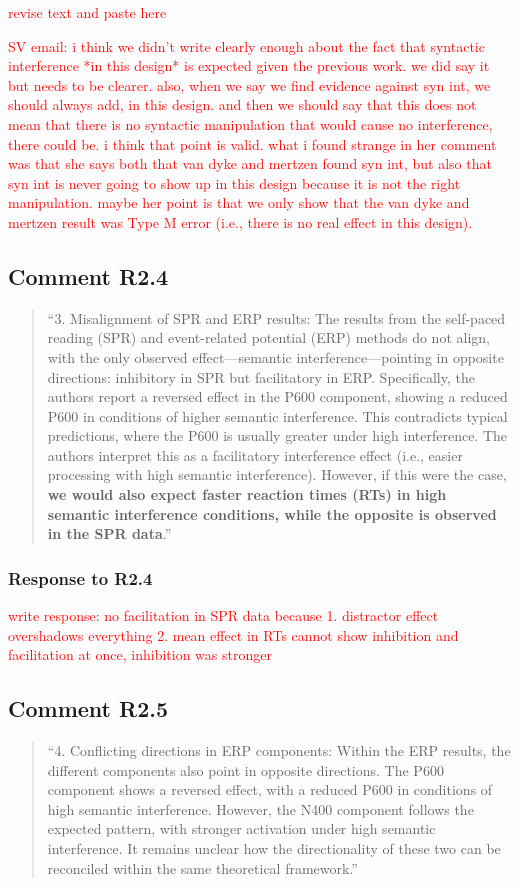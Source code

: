 \documentclass[12pt]{article}
\begin{document}
\textcolor{red}{revise text and paste here}

\textcolor{red}{SV email: i think we didn't write clearly enough about the fact that syntactic interference *in this design* is expected given the previous work. we did say it but needs to be clearer. also, when we say we find evidence against syn int, we should always add, in this design. and then we should say that this does not mean that there is no syntactic manipulation that would cause no interference, there could be. i think that point is valid. what i found strange in her comment was that she says both that van dyke and mertzen found syn int, but also that syn int is never going to show up in this design because it is not the right manipulation.  maybe her point is that we only show that the van dyke and mertzen result was Type M error (i.e., there is no real effect in this design).}
 
\subsection*{Comment R2.4}
\begin{quote}
``3. Misalignment of SPR and ERP results: The results from the self-paced reading (SPR) and event-related potential (ERP) methods do not align, with the only observed effect—semantic interference—pointing in opposite directions: inhibitory in SPR but facilitatory in ERP. Specifically, the authors report a reversed effect in the P600 component, showing a reduced P600 in conditions of higher semantic interference. This contradicts typical predictions, where the P600 is usually greater under high interference. The authors interpret this as a facilitatory interference effect (i.e., easier processing with high semantic interference). However, if this were the case, \textbf{we would also expect faster reaction times (RTs) in high semantic interference conditions, while the opposite is observed in the SPR data}.''
\end{quote}

\subsubsection*{Response to R2.4}
 \textcolor{red}{write response: no facilitation in SPR data because 1. distractor effect overshadows everything 2. mean effect in RTs cannot show inhibition and facilitation at once, inhibition was stronger}

 
\subsection*{Comment R2.5}
\begin{quote}
``4. Conflicting directions in ERP components: Within the ERP results, the different components also point in opposite directions. The P600 component shows a reversed effect, with a reduced P600 in conditions of high semantic interference. However, the N400 component follows the expected pattern, with stronger activation under high semantic interference. It remains unclear how the directionality of these two can be reconciled within the same theoretical framework.''
\end{quote}
\end{document}
